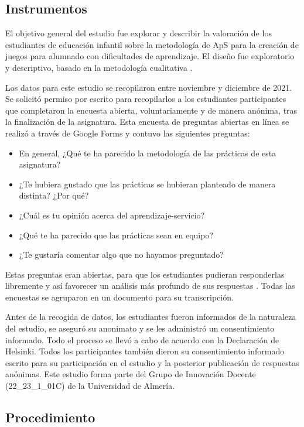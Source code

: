 \documentclass[spanish]{textolivre}
\begin{document}
\subsection{Instrumentos}

El objetivo general del estudio fue explorar y describir la valoración de los estudiantes de educación infantil sobre la metodología de ApS para la creación de juegos para alumnado con dificultades de aprendizaje. El diseño fue exploratorio y descriptivo, basado en la metodología cualitativa \cite{flick_introduccion_2012}.

Los datos para este estudio se recopilaron entre noviembre y diciembre de 2021. Se solicitó permiso por escrito para recopilarlos a los estudiantes participantes que completaron la encuesta abierta, voluntariamente y de manera anónima, tras la finalización de la asignatura. Esta encuesta de preguntas abiertas en línea se realizó a través de Google Forms y contuvo las siguientes preguntas: 
\begin{itemize}[label=-]
    \item En general, ¿Qué te ha parecido la metodología de las prácticas de esta asignatura? 
    \item ¿Te hubiera gustado que las prácticas se hubieran planteado de manera distinta? ¿Por qué? 
    \item ¿Cuál es tu opinión acerca del aprendizaje-servicio? 
    \item ¿Qué te ha parecido que las prácticas sean en equipo?
    \item ¿Te gustaría comentar algo que no hayamos preguntado?
\end{itemize}

Estas preguntas eran abiertas, para que los estudiantes pudieran responderlas libremente y así favorecer un análisis más profundo de sus respuestas \cite{de_la_cuesta-benjumea_por_2008}. Todas las encuestas se agruparon en un documento para su transcripción.

Antes de la recogida de datos, los estudiantes fueron informados de la naturaleza del estudio, se aseguró su anonimato y se les administró un consentimiento informado. Todo el proceso se llevó a cabo de acuerdo con la Declaración de Helsinki. Todos los participantes también dieron su consentimiento informado escrito para su participación en el estudio y la posterior publicación de respuestas anónimas. Este estudio forma parte del Grupo de Innovación Docente (22\_23\_1\_01C) de la Universidad de Almería.

\subsection{Procedimiento}
\end{document}
